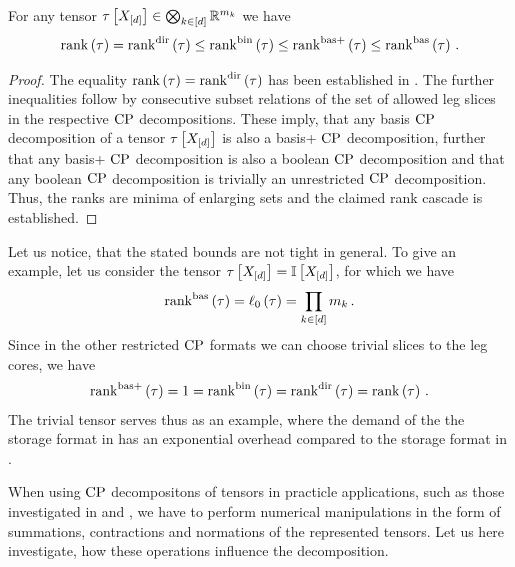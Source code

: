 \begin{theorem}
    \label{the:rankCascade}
    For any tensor $\tau\left[X_{[d]}\right]\in\bigotimes_{k\in[d]} \mathbb{R}^{m_{k}}$ we have
    \begin{align*}
        \mathrm{rank}\left(\tau\right) = \mathrm{rank}^{\mathrm{dir}}\left(\tau\right) \leq \mathrm{rank}^{\mathrm{bin}}\left(\tau\right) \leq \mathrm{rank}^{\mathrm{bas+}}\left(\tau\right) \leq \mathrm{rank}^{\mathrm{bas}}\left(\tau\right) \, .
    \end{align*}
\end{theorem}
\begin{proof}
    The equality $\mathrm{rank}\left(\tau\right) = \mathrm{rank}^{\mathrm{dir}}\left(\tau\right)$ has been established in .
    The further inequalities follow by consecutive subset relations of the set of allowed leg slices in the respective $\mathrm{CP}$ decompositions.
    These imply, that any basis $\mathrm{CP}$ decomposition of a tensor $\tau\left[X_{[d]}\right]$ is also a basis+ $\mathrm{CP}$ decomposition, further that any basis+ $\mathrm{CP}$ decomposition is also a boolean $\mathrm{CP}$ decomposition and that any boolean $\mathrm{CP}$ decomposition is trivially an unrestricted $\mathrm{CP}$ decomposition.
    Thus, the ranks are minima of enlarging sets and the claimed rank cascade is established.
\end{proof}

Let us notice, that the stated bounds are not tight in general.
To give an example, let us consider the tensor $\tau\left[X_{[d]}\right]=\mathbb{I}\left[X_{[d]}\right]$, for which we have
\begin{align*}
    \mathrm{rank}^{\mathrm{bas}}\left(\tau\right) = \ell_0\left(\tau\right) = \prod_{k\in[d]}m_{k} \, .
\end{align*}
Since in the other restricted $\mathrm{CP}$ formats we can choose trivial slices to the leg cores, we have
\begin{align*}
    \mathrm{rank}^{\mathrm{bas+}}\left(\tau\right) = 1 = \mathrm{rank}^{\mathrm{bin}}\left(\tau\right) = \mathrm{rank}^{\mathrm{dir}}\left(\tau\right) = \mathrm{rank}\left(\tau\right) \, .
\end{align*}
The trivial tensor serves thus as an example, where the demand of the the storage format in  has an exponential overhead compared to the storage format in .



When using $\mathrm{CP}$ decompositons of tensors in practicle applications, such as those investigated in  and , we have to perform numerical manipulations in the form of summations, contractions and normations of the represented tensors.
Let us here investigate, how these operations influence the decomposition.

